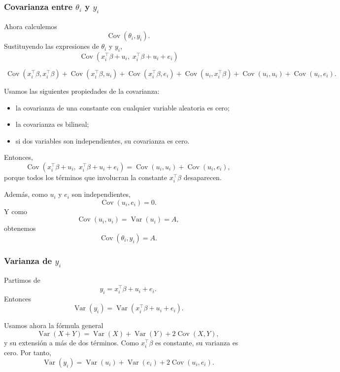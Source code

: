 \subsubsection*{Covarianza entre $\theta_i$ y $y_i$}

Ahora calculemos
\[
\operatorname{Cov}(\theta_i,y_i).
\]
Sustituyendo las expresiones de $\theta_i$ y $y_i$,
\[
\
\operatorname{Cov}(x_i^{\top}\beta+u_i,\;x_i^{\top}\beta+u_i+e_i)
\]

\[
\
\operatorname{Cov}(x_i^{\top}\beta,x_i^{\top}\beta)
+\operatorname{Cov}(x_i^{\top}\beta,u_i)
+\operatorname{Cov}(x_i^{\top}\beta,e_i)
+\operatorname{Cov}(u_i,x_i^{\top}\beta)
+\operatorname{Cov}(u_i,u_i)
+\operatorname{Cov}(u_i,e_i).
\]



Usamos las siguientes propiedades de la covarianza:
\begin{itemize}
    \item la covarianza de una constante con cualquier variable aleatoria es cero;
    \item la covarianza es bilineal;
    \item si dos variables son independientes, su covarianza es cero.
\end{itemize}

Entonces,
\[
\operatorname{Cov}(x_i^{\top}\beta+u_i,\;x_i^{\top}\beta+u_i+e_i)
=
\operatorname{Cov}(u_i,u_i)+\operatorname{Cov}(u_i,e_i),
\]
porque todos los términos que involucran la constante $x_i^{\top}\beta$ desaparecen.

Además, como $u_i$ y $e_i$ son independientes,
\[
\operatorname{Cov}(u_i,e_i)=0.
\]
Y como
\[
\operatorname{Cov}(u_i,u_i)=\operatorname{Var}(u_i)=A,
\]
obtenemos
\[
\operatorname{Cov}(\theta_i,y_i)=A.
\]

\subsubsection*{Varianza de $y_i$}

Partimos de
\[
y_i=x_i^{\top}\beta+u_i+e_i.
\]
Entonces
\[
\operatorname{Var}(y_i)=\operatorname{Var}(x_i^{\top}\beta+u_i+e_i).
\]

Usamos ahora la fórmula general
\[
\operatorname{Var}(X+Y)=\operatorname{Var}(X)+\operatorname{Var}(Y)+2\operatorname{Cov}(X,Y),
\]
y su extensión a más de dos términos. Como $x_i^{\top}\beta$ es constante, su varianza es cero. Por tanto,
\[
\operatorname{Var}(y_i)=\operatorname{Var}(u_i)+\operatorname{Var}(e_i)+2\operatorname{Cov}(u_i,e_i).
\]

